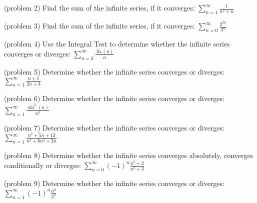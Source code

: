 \documentclass[handout]{ximera}
\begin{document}
\begin{problem}(problem 2)
Find the sum of the infinite series, if it converges: $\displaystyle\sum_{n=1}^\infty \frac{1}{n^2 +n}$

\end{problem}


\begin{problem}(problem 3)
Find the sum of the infinite series, if it converges: $\displaystyle \sum_{n=0}^\infty \frac{2^{2n}}{3^n}$

\end{problem}

\begin{problem}(problem 4)
Use the Integral Test to determine whether the infinite series converges or diverges:  $\displaystyle \sum_{n=2}^\infty \frac{\ln(n)}{n}$

\end{problem}

\begin{problem}(problem 5)
Determine whether the infinite series converges or diverges: $\displaystyle \sum_{n=1}^\infty \frac{n+1}{2n+3}$

\end{problem}

\begin{problem}(problem 6)
Determine whether the infinite series converges or diverges: $\displaystyle \sum_{n=1}^\infty \frac{\sin^2(n)}{n^3}$

\end{problem}

\begin{problem}(problem 7)
Determine whether the infinite series converges or diverges: $\displaystyle \sum_{n=1}^\infty \frac{n^2 + 5n + 12}{n^3 + 6n^2 + 2n}$

\end{problem}

\begin{problem}(problem 8)
Determine whether the infinite series converges absolutely, converges conditionally or diverges: $\displaystyle \sum_{n=0}^\infty (-1)^n \frac{n^2 + 2}{n^3 + 3}$

\end{problem}

\begin{problem}(problem 9)
Determine whether the infinite series converges or diverges: $\displaystyle \sum_{n=1}^\infty (-1)^n\frac{n^2}{3^n}$

\end{problem}
\end{document}
